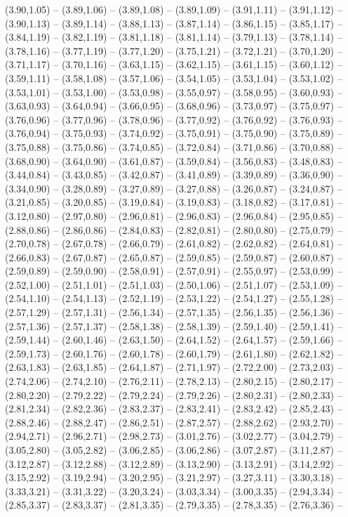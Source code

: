 {(3.90,1.05) -- (3.89,1.06) -- (3.89,1.08) -- (3.89,1.09) -- (3.91,1.11) -- (3.91,1.12) -- (3.90,1.13) -- (3.89,1.14) -- (3.88,1.13) -- (3.87,1.14) -- (3.86,1.15) -- (3.85,1.17) -- (3.84,1.19) -- (3.82,1.19) -- (3.81,1.18) -- (3.81,1.14) -- (3.79,1.13) -- (3.78,1.14) -- (3.78,1.16) -- (3.77,1.19) -- (3.77,1.20) -- (3.75,1.21) -- (3.72,1.21) -- (3.70,1.20) -- (3.71,1.17) -- (3.70,1.16) -- (3.63,1.15) -- (3.62,1.15) -- (3.61,1.15) -- (3.60,1.12) -- (3.59,1.11) -- (3.58,1.08) -- (3.57,1.06) -- (3.54,1.05) -- (3.53,1.04) -- (3.53,1.02) -- (3.53,1.01) -- (3.53,1.00) -- (3.53,0.98) -- (3.55,0.97) -- (3.58,0.95) -- (3.60,0.93) -- (3.63,0.93) -- (3.64,0.94) -- (3.66,0.95) -- (3.68,0.96) -- (3.73,0.97) -- (3.75,0.97) -- (3.76,0.96) -- (3.77,0.96) -- (3.78,0.96) -- (3.77,0.92) -- (3.76,0.92) -- (3.76,0.93) -- (3.76,0.94) -- (3.75,0.93) -- (3.74,0.92) -- (3.75,0.91) -- (3.75,0.90) -- (3.75,0.89) -- (3.75,0.88) -- (3.75,0.86) -- (3.74,0.85) -- (3.72,0.84) -- (3.71,0.86) -- (3.70,0.88) -- (3.68,0.90) -- (3.64,0.90) -- (3.61,0.87) -- (3.59,0.84) -- (3.56,0.83) -- (3.48,0.83) -- (3.44,0.84) -- (3.43,0.85) -- (3.42,0.87) -- (3.41,0.89) -- (3.39,0.89) -- (3.36,0.90) -- (3.34,0.90) -- (3.28,0.89) -- (3.27,0.89) -- (3.27,0.88) -- (3.26,0.87) -- (3.24,0.87) -- (3.21,0.85) -- (3.20,0.85) -- (3.19,0.84) -- (3.19,0.83) -- (3.18,0.82) -- (3.17,0.81) -- (3.12,0.80) -- (2.97,0.80) -- (2.96,0.81) -- (2.96,0.83) -- (2.96,0.84) -- (2.95,0.85) -- (2.88,0.86) -- (2.86,0.86) -- (2.84,0.83) -- (2.82,0.81) -- (2.80,0.80) -- (2.75,0.79) -- (2.70,0.78) -- (2.67,0.78) -- (2.66,0.79) -- (2.61,0.82) -- (2.62,0.82) -- (2.64,0.81) -- (2.66,0.83) -- (2.67,0.87) -- (2.65,0.87) -- (2.59,0.85) -- (2.59,0.87) -- (2.60,0.87) -- (2.59,0.89) -- (2.59,0.90) -- (2.58,0.91) -- (2.57,0.91) -- (2.55,0.97) -- (2.53,0.99) -- (2.52,1.00) -- (2.51,1.01) -- (2.51,1.03) -- (2.50,1.06) -- (2.51,1.07) -- (2.53,1.09) -- (2.54,1.10) -- (2.54,1.13) -- (2.52,1.19) -- (2.53,1.22) -- (2.54,1.27) -- (2.55,1.28) -- (2.57,1.29) -- (2.57,1.31) -- (2.56,1.34) -- (2.57,1.35) -- (2.56,1.35) -- (2.56,1.36) -- (2.57,1.36) -- (2.57,1.37) -- (2.58,1.38) -- (2.58,1.39) -- (2.59,1.40) -- (2.59,1.41) -- (2.59,1.44) -- (2.60,1.46) -- (2.63,1.50) -- (2.64,1.52) -- (2.64,1.57) -- (2.59,1.66) -- (2.59,1.73) -- (2.60,1.76) -- (2.60,1.78) -- (2.60,1.79) -- (2.61,1.80) -- (2.62,1.82) -- (2.63,1.83) -- (2.63,1.85) -- (2.64,1.87) -- (2.71,1.97) -- (2.72,2.00) -- (2.73,2.03) -- (2.74,2.06) -- (2.74,2.10) -- (2.76,2.11) -- (2.78,2.13) -- (2.80,2.15) -- (2.80,2.17) -- (2.80,2.20) -- (2.79,2.22) -- (2.79,2.24) -- (2.79,2.26) -- (2.80,2.31) -- (2.80,2.33) -- (2.81,2.34) -- (2.82,2.36) -- (2.83,2.37) -- (2.83,2.41) -- (2.83,2.42) -- (2.85,2.43) -- (2.88,2.46) -- (2.88,2.47) -- (2.86,2.51) -- (2.87,2.57) -- (2.88,2.62) -- (2.93,2.70) -- (2.94,2.71) -- (2.96,2.71) -- (2.98,2.73) -- (3.01,2.76) -- (3.02,2.77) -- (3.04,2.79) -- (3.05,2.80) -- (3.05,2.82) -- (3.06,2.85) -- (3.06,2.86) -- (3.07,2.87) -- (3.11,2.87) -- (3.12,2.87) -- (3.12,2.88) -- (3.12,2.89) -- (3.13,2.90) -- (3.13,2.91) -- (3.14,2.92) -- (3.15,2.92) -- (3.19,2.94) -- (3.20,2.95) -- (3.21,2.97) -- (3.27,3.11) -- (3.30,3.18) -- (3.33,3.21) -- (3.31,3.22) -- (3.20,3.24) -- (3.03,3.34) -- (3.00,3.35) -- (2.94,3.34) -- (2.85,3.37) -- (2.83,3.37) -- (2.81,3.35) -- (2.79,3.35) -- (2.78,3.35) -- (2.76,3.36) -- }
